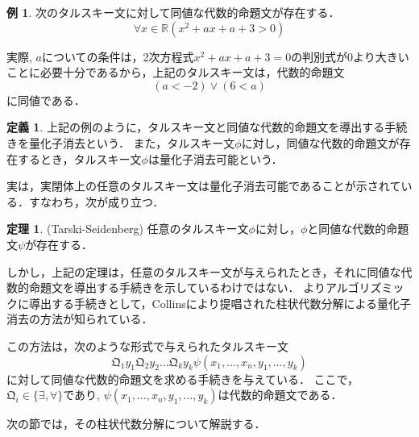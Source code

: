 \documentclass[uplatex, dvipdfmx]{jsarticle}
\newcommand{\R}{\mathbb{R}}
\newcommand{\Qua}{\mathfrak{Q}}
\theoremstyle{definition}
\newtheorem{definition}{定義}[section]
\newtheorem{theorem}{定理}[section]
\newtheorem{example}{例}[section]
\begin{document}
\begin{example}
     次のタルスキー文に対して同値な代数的命題文が存在する．
     \begin{equation*}
          \forall x \in \R (x^2 + ax + a + 3 > 0)
     \end{equation*}

     実際, $a$についての条件は，2次方程式$x^2 + ax + a + 3 = 0$の判別式が0より大きいことに必要十分であるから，上記のタルスキー文は，代数的命題文
     \begin{equation*}
          (a < -2) \lor (6 < a)
     \end{equation*}
     に同値である．
\end{example}


\begin{definition}
上記の例のように，タルスキー文と同値な代数的命題文を導出する手続きを量化子消去という．
また，タルスキー文$\phi$に対し，同値な代数的命題文が存在するとき，タルスキー文$\phi$は量化子消去可能という．
\end{definition}

実は，実閉体上の任意のタルスキー文は量化子消去可能であることが示されている．すなわち，次が成り立つ．

\begin{theorem}(Tarski-Seidenberg)
     任意のタルスキー文$\phi$に対し，$\phi$と同値な代数的命題文$\psi$が存在する．
\end{theorem}

しかし，上記の定理は，任意のタルスキー文が与えられたとき，それに同値な代数的命題文を導出する手続きを示しているわけではない．
よりアルゴリズミックに導出する手続きとして，Collinsにより提唱された柱状代数分解による量化子消去の方法が知られている．

この方法は，次のような形式で与えられたタルスキー文
\begin{equation*}
     \Qua_1 y_1 \Qua_2 y_2 \dots \Qua_k y_k \psi(x_1, \dots, x_n, y_1, \dots, y_k)
\end{equation*}
に対して同値な代数的命題文を求める手続きを与えている．
ここで，$\Qua_i \in \{\exists, \forall\}$であり, $\psi(x_1, \dots, x_n, y_1, \dots, y_k)$は代数的命題文である． 

次の節では，その柱状代数分解について解説する．


\end{document}

